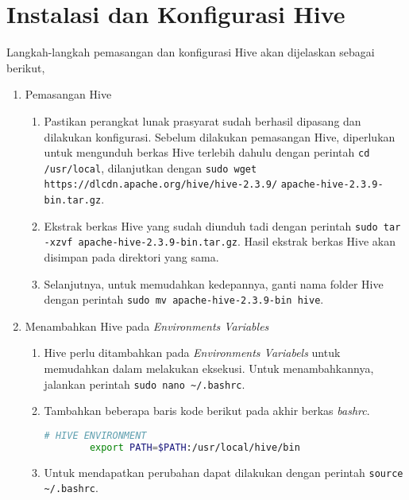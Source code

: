 \chapter{Instalasi dan Konfigurasi Hive}

Langkah-langkah pemasangan dan konfigurasi Hive akan dijelaskan sebagai berikut,

\begin{enumerate}
  \item Pemasangan Hive
  \begin{enumerate}
    \item Pastikan perangkat lunak prasyarat sudah berhasil dipasang dan dilakukan konfigurasi. Sebelum dilakukan pemasangan Hive, diperlukan untuk mengunduh berkas Hive terlebih dahulu dengan perintah \verb|cd /usr/local|, dilanjutkan dengan \verb|sudo wget https://dlcdn.apache.org/hive/hive-2.3.9/|
    \newline \verb|apache-hive-2.3.9-bin.tar.gz|.
    \item Ekstrak berkas Hive yang sudah diunduh tadi dengan perintah \verb|sudo tar -xzvf apache-hive-2.3.9-bin.tar.gz|. Hasil ekstrak berkas Hive akan disimpan pada direktori yang sama.
    \item Selanjutnya, untuk memudahkan kedepannya, ganti nama folder Hive dengan perintah \verb|sudo mv apache-hive-2.3.9-bin hive|.
  \end{enumerate}
  \item Menambahkan Hive pada \textit{Environments Variables}
  \begin{enumerate}
    \item Hive perlu ditambahkan pada \textit{Environments Variabels} untuk memudahkan dalam melakukan eksekusi. Untuk menambahkannya, jalankan perintah \verb|sudo nano ~/.bashrc|.
    \item Tambahkan beberapa baris kode berikut pada akhir berkas \textit{bashrc}.
      \begin{lstlisting}[language=bash]
		# HIVE ENVIRONMENT
		export PATH=$PATH:/usr/local/hive/bin
      \end{lstlisting}
    \item Untuk mendapatkan perubahan dapat dilakukan dengan perintah \verb|source ~/.bashrc|.
  \end{enumerate}
\end{enumerate}